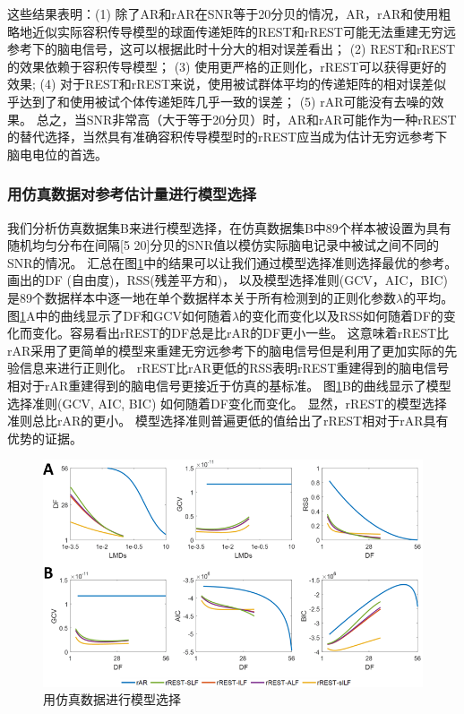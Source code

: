 这些结果表明：(1) 除了AR和rAR在SNR等于20分贝的情况，AR，rAR和使用粗略地近似实际容积传导模型的球面传递矩阵的REST和rREST可能无法重建无穷远参考下的脑电信号，这可以根据此时十分大的相对误差看出； (2) REST和rREST的效果依赖于容积传导模型； (3) 使用更严格的正则化，rREST可以获得更好的效果; (4) 对于REST和rREST来说，使用被试群体平均的传递矩阵的相对误差似乎达到了和使用被试个体传递矩阵几乎一致的误差； (5) rAR可能没有去噪的效果。 总之，当SNR非常高（大于等于20分贝）时，AR和rAR可能作为一种rREST的替代选择，当然具有准确容积传导模型时的rREST应当成为估计无穷远参考下脑电电位的首选。

\subsubsection{用仿真数据对参考估计量进行模型选择}
我们分析仿真数据集B来进行模型选择，在仿真数据集B中89个样本被设置为具有随机均匀分布在间隔[5 20]分贝的SNR值以模仿实际脑电记录中被试之间不同的SNR的情况。 汇总在图\ref{3.5}中的结果可以让我们通过模型选择准则选择最优的参考。 画出的DF (自由度)，RSS(残差平方和)， 以及模型选择准则(GCV，AIC，BIC) 是89个数据样本中逐一地在单个数据样本关于所有检测到的正则化参数$\lambda$的平均。
图\ref{3.5}A中的曲线显示了DF和GCV如何随着$\lambda$的变化而变化以及RSS如何随着DF的变化而变化。容易看出rREST的DF总是比rAR的DF更小一些。 这意味着rREST比rAR采用了更简单的模型来重建无穷远参考下的脑电信号但是利用了更加实际的先验信息来进行正则化。 rREST比rAR更低的RSS表明rREST重建得到的脑电信号相对于rAR重建得到的脑电信号更接近于仿真的基标准。 图\ref{3.5}B的曲线显示了模型选择准则(GCV, AIC, BIC) 如何随着DF变化而变化。 显然，rREST的模型选择准则总比rAR的更小。 模型选择准则普遍更低的值给出了rREST相对于rAR具有优势的证据。
\begin{figure}[!ht]
	\centering
	\includegraphics[width=15cm]{pic/Frontier/figure5.png}
	\caption{用仿真数据进行模型选择}
	\label{3.5}
\end{figure}

